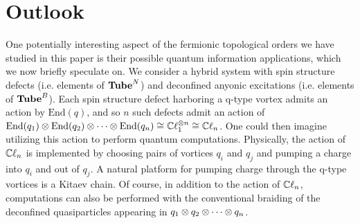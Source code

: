 
\section{Outlook} \label{discussion}

One potentially interesting aspect of the fermionic topological orders we have studied in this paper is their possible quantum information 
applications, which we now briefly speculate on. 
We consider a hybrid system with spin structure defects (i.e. elements of $\textbf{Tube}^N$) and deconfined anyonic excitations (i.e. elements of $\textbf{Tube}^B$).
Each spin structure defect harboring a q-type vortex admits an action by $\text{End}(q)$, 
and so $n$ such defects admit an action of $\text{End}(q_1) \otimes \text{End}(q_2) \otimes \cdots \otimes \text{End}(q_n) \cong \mathbb{C}\ell_1^{\otimes n} \cong \mathbb{C}\ell_n$.
One could then imagine utilizing this action to perform quantum computations. 
Physically, the action of $\mathbb{C}\ell_n$ is implemented by choosing pairs of vortices $q_i$ and $q_j$ and pumping a charge into $q_i$ and out of $q_j$.
A natural platform for pumping charge through the q-type vortices is a Kitaev chain.
Of course, in addition to the action of $\mathbb{C}\ell_n$, computations can also be performed with the conventional braiding of the deconfined quasiparticles appearing in $q_1 \otimes q_2 \otimes \cdots \otimes q_n$.


